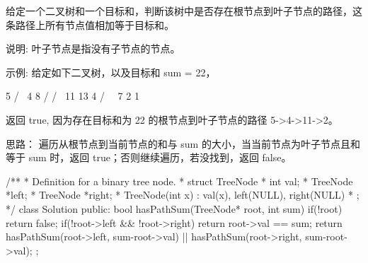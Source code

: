 给定一个二叉树和一个目标和，判断该树中是否存在根节点到叶子节点的路径，这条路径上所有节点值相加等于目标和。

说明: 叶子节点是指没有子节点的节点。

示例: 
给定如下二叉树，以及目标和 sum = 22，

              5
             / \
            4   8
           /   / \
          11  13  4
         /  \      \
        7    2      1

返回 true, 因为存在目标和为 22 的根节点到叶子节点的路径 5->4->11->2。

























思路：
遍历从根节点到当前节点的和与 sum 的大小，当当前节点为叶子节点且和等于 sum 时，返回 true；否则继续遍历，若没找到，返回 false。


























/**
 * Definition for a binary tree node.
 * struct TreeNode {
 *     int val;
 *     TreeNode *left;
 *     TreeNode *right;
 *     TreeNode(int x) : val(x), left(NULL), right(NULL) {}
 * };
 */
class Solution {
public:
    bool hasPathSum(TreeNode* root, int sum) {
        if(!root) return false;
        if(!root->left && !root->right) return root->val == sum;
        return hasPathSum(root->left, sum-root->val) || hasPathSum(root->right, sum-root->val);
    }
};